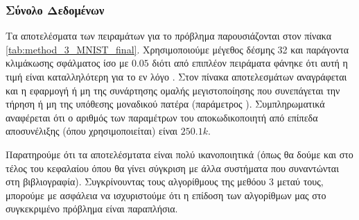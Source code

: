 \subsubsection{Σύνολο Δεδομένων }

Τα αποτελέσματα των πειραμάτων για το πρόβλημα  παρουσιάζονται στον πίνακα \ref{tab:method_3_MNIST_final}. Χρησιμοποιούμε μέγεθος δέσμης 32 και παράγοντα κλιμάκωσης σφάλματος ίσο με $0.05$ διότι από επιπλέον πειράματα φάνηκε ότι αυτή η τιμή είναι καταλληλότερη για το εν λόγο . Στον πίνακα αποτελεσμάτων αναγράφεται και η εφαρμογή ή μη της συνάρτησης ομαλής μεγιστοποίησης που συνεπάγεται την τήρηση ή μη της υπόθεσης μοναδικού πατέρα (παράμετρος ). Συμπληρωματικά αναφέρεται ότι ο αριθμός των παραμέτρων του αποκωδικοποιητή από επίπεδα αποσυνέλιξης (όπου χρησιμοποιείται) είναι $250.1k$.

\begin{table}[h]
    \begin{center}
    \end{center}
    \caption[]{\label{tab:method_3_MNIST_final}Επίδωση των αλγορίθμων της μεθόδου 3 στο σύνολο δεδομένων , όταν χρησιμοποιούνται 30 εποχές για την εκπαίδευση του μοντέλου με μέγεθος δέσμης 32. Το αποτέλεσμα με αστερίσκο προέκυψε μετά από 60 εποχές.} 
\end{table}

Παρατηρούμε ότι τα αποτελέσμτατα είναι πολύ ικανοποιητικά (όπως θα δούμε και στο τέλος του κεφαλαίου όπου θα γίνει σύγκριση με άλλα συστήματα που συναντώνται στη βιβλιογραφία). Συγκρίνουντας τους αλγορίθμους της μεθόου 3 μεταύ τους, μπορούμε με ασφάλεια να ισχυριστούμε ότι η επίδοση των αλγορίθμων μας στο συγκεκριμένο πρόβλημα είναι παραπλήσια. \par

